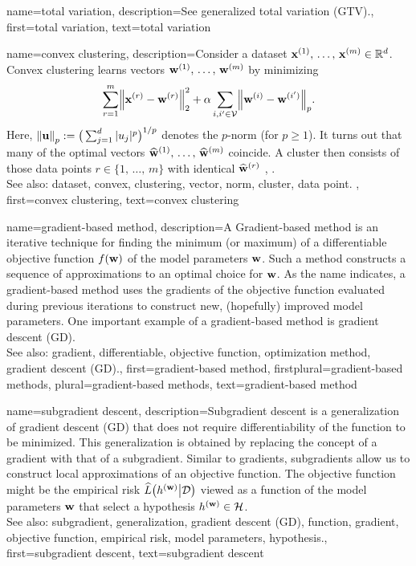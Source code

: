 {
{name={total variation}, 
	description={See generalized total variation (GTV).},
	first={total variation},
	text={total variation} 
}


 {name={convex clustering}, 
 	description={Consider a dataset 
 		${\bf x}^{(1)}, \,\ldots, \,{\bf x}^{(m)} \in \mathbb{R}^{d}$. 
 		Convex clustering learns vectors ${\bf w}^{(1)}, \,\ldots, \,{\bf w}^{(m)}$ by minimizing 
 		$$\sum_{r=1}^{m} \mleft\lVert {\bf x}^{(r)} - {\bf w}^{(r)} \mright\rVert_{2}^2 + 
 		\alpha \sum_{i,i' \in \mathcal{V}} \mleft\lVert {\bf w}^{(i)} - {\bf w}^{(i')} \mright\rVert_{p}.$$ 
		Here, $\mleft\lVert {\bf u} \mright\rVert_{p} := \big( \sum_{j=1}^{d} |u_{j}|^{p} \big)^{1/p}$ 
		denotes the $p$-norm (for $p\geq1$).  
		It turns out that many of the optimal vectors $\widehat{{\bf w}}^{(1)}, \,\ldots, \,\widehat{{\bf w}}^{(m)}$ 
		coincide. A cluster then consists of those data points $r \in \{1, \,\ldots, \,m\}$ 
		with identical $\widehat{{\bf w}}^{(r)}$ \cite{JMLR:v22:18-694}, \cite{Pelckmans2005}. 
			\\
		See also: dataset, convex, clustering, vector, norm, cluster, data point. },
 	first={convex clustering},
	text={convex clustering} 
}


{name={gradient-based method}, 
	description={A Gradient-based 
		method is an iterative technique for finding the minimum (or maximum) 
		of a differentiable objective function $f({\bf w})$ of the model parameters ${\bf w}$. 
		Such a method constructs a sequence of approximations to an optimal choice for ${\bf w}$. 
		As the name indicates, a gradient-based method uses the gradients 
		of the objective function evaluated during previous iterations to construct new, 
		(hopefully) improved model parameters. One important example of a gradient-based 
		method is gradient descent (GD).
				\\
		See also: gradient, differentiable, objective function, optimization method, gradient descent (GD).},
	first={gradient-based method},
	firstplural={gradient-based methods},
	plural={gradient-based methods},
	text={gradient-based method} 
}


{name={subgradient descent}, 
	description={Subgradient 
		descent is a generalization of gradient descent (GD) that does not require differentiability of the 
		function to be minimized. This generalization is obtained by replacing the concept 
		of a gradient with that of a subgradient. Similar to gradients, subgradients 
		allow us to construct local approximations of an objective function. The objective function 
		might be the empirical risk $\widehat{L}\big( h^{({\bf w})} \big| \mathcal{D} \big)$ viewed 
		as a function of the model parameters ${\bf w}$ that select a hypothesis $h^{({\bf w})} \in \mathcal{H}$.
				\\
		See also: subgradient, generalization, gradient descent (GD), function, gradient, objective function, empirical risk, model parameters, hypothesis.},
	first={subgradient descent},
	text={subgradient descent} 
}
	
}
